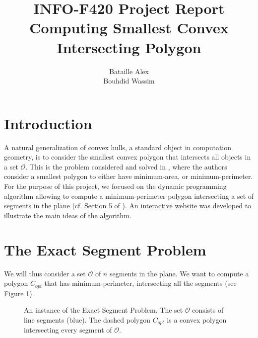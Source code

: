 \documentclass{article}
\title{INFO-F420 Project Report\\ Computing Smallest Convex Intersecting Polygon}
\author{Bataille Alex \\ Bouhdid Wassim}
\begin{document}
\maketitle 

\section{Introduction}
A natural generalization of convex hulls, a standard object in computation geometry, is to consider the smallest convex polygon 
that intersects all objects in a set $\mathcal{O}$. This is the problem considered and solved in \cite{Antoniadis_deBerg_Kisfaludi-Bak_Skarlatos_2025}, where the authors consider a smallest 
polygon to either have minimum-area, or minimum-perimeter. For the purpose of this project, we focused on the dynamic programming algorithm allowing to compute a minimum-perimeter polygon intersecting 
a set of segments in the plane (cf. Section 5 of \cite{Antoniadis_deBerg_Kisfaludi-Bak_Skarlatos_2025}). An \href{https://alexei-x.github.io/info-F420-project/}{interactive website} was developed to illustrate the main ideas of the algorithm. 

\section{The Exact Segment Problem}
We will thus consider a set $\mathcal{O}$ of $n$ segments in the plane. We want to compute a polygon $C_{opt}$ that has minimum-perimeter, intersecting all the segments (see Figure \ref{fig:segments-instance}). 
\begin{figure}[h] \centering {} 
\caption{An instance of the Exact Segment Problem. The set $\mathcal O$ consists of line segments (blue). The dashed polygon $C_{opt}$ is a convex polygon intersecting every segment of $\mathcal O$.} 
    \label{fig:segments-instance} 
\end{figure}
\end{document}
